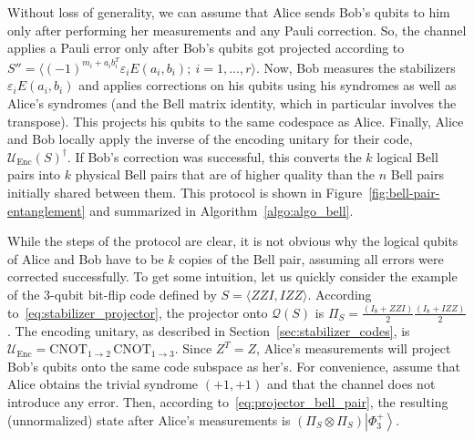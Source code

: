 \documentclass[journal,onecolumn]{IEEEtran}
\newcommand{\dket}[1]{\left\lvert #1 \right\rangle}
\newcommand{\etal}{\emph{et al.~}}
\newif\ifnotes
\newcommand{\narayanan}[1]{\ifnotes{{\color{blue} [Narayanan: #1]}}\fi}
\newcommand{\bane}[1]{\ifnotes{{\color{dkgreen} [Bane: #1]}}\fi}
\begin{document}
Without loss of generality, we can assume that Alice sends Bob's qubits to him only after performing her measurements and any Pauli correction. 
So, the channel applies a Pauli error only after Bob's qubits got projected according to $S'' = \langle (-1)^{m_i + a_i b_i^T} \varepsilon_i E(a_i,b_i); \ i = 1,\ldots,r \rangle$. %
Now, Bob measures the stabilizers $\varepsilon_i E(a_i,b_i)$ and applies corrections on his qubits using his syndromes as well as Alice's syndromes (and the Bell matrix identity, which in particular involves the transpose). 
This projects his qubits to the same codespace as Alice.
Finally, Alice and Bob locally apply the inverse of the encoding unitary for their code, $\mathcal{U}_{\text{Enc}}(S)^\dagger$. 
If Bob's correction was successful, this converts the $k$ logical Bell pairs into $k$ physical Bell pairs that are of higher quality than the $n$ Bell pairs initially shared between them.
This protocol is shown in Figure~\ref{fig:bell-pair-entanglement} and summarized in Algorithm~\ref{algo:algo_bell}. 

 
While the steps of the protocol are clear, it is not obvious why the logical qubits of Alice and Bob have to be $k$ copies of the Bell pair, assuming all errors were corrected successfully.
To get some intuition, let us quickly consider the example of the $3$-qubit bit-flip code defined by $S = \langle ZZI, IZZ \rangle$.
According to~\eqref{eq:stabilizer_projector}, the projector onto $\mathcal{Q}(S)$ is $\Pi_S = \frac{(I_8 + ZZI)}{2} \frac{(I_8 + IZZ)}{2}$.
The encoding unitary, as described in Section~\ref{sec:stabilizer_codes}, is $\mathcal{U}_{\text{Enc}} = \text{CNOT}_{1 \rightarrow 2}\, \text{CNOT}_{1 \rightarrow 3}$.
Since $Z^T = Z$, Alice's measurements will project Bob's qubits onto the same code subspace as her's.
For convenience, assume that Alice obtains the trivial syndrome $(+1,+1)$ and that the channel does not introduce any error.
Then, according to~\eqref{eq:projector_bell_pair}, the resulting (unnormalized) state after Alice's measurements is $(\Pi_S \otimes \Pi_S) \dket{\Phi_3^+}$.
\end{document}
